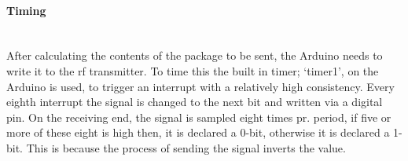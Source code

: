 \paragraph{Timing} \hfill \\
After calculating the contents of the package to be sent, the Arduino needs to write it to the \gls{rf} transmitter. 
To time this the built in timer; \enquote*{timer1}, on the Arduino is used, to trigger an interrupt with a relatively high consistency.
Every eighth interrupt the signal is changed to the next bit and written via a digital pin. 
On the receiving end, the signal is sampled eight times pr. period, if five or more of these eight is high then, it is declared a 0-bit, otherwise it is declared a 1-bit. %
This is because the process of sending the signal inverts the value.